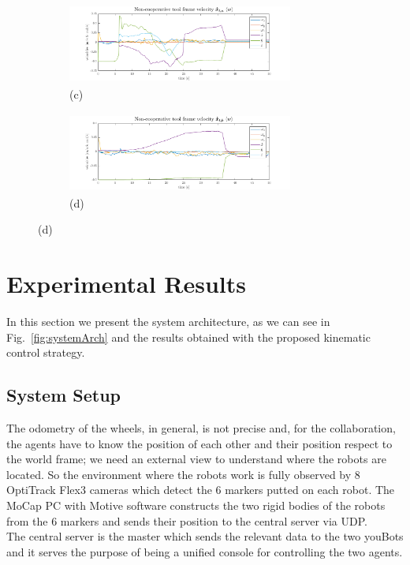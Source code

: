 \documentclass[a4paper, 12pt, notitlepage]{article}
\begin{document}
\begin{multicols}{2}
\begin{figure}[b!]
			\vspace{10px}
			\begin{subfigure}{.5\linewidth}
				\hspace{-30px}
				\includegraphics[width=280px,height=100px]{noncoopa}
				\caption{\hspace{-15px}(c)}
				\label{fig::c}
			\end{subfigure}
			\hfill
			\begin{subfigure}{.5\linewidth}
				\hspace{-10px}
				\includegraphics[width=280px,height=100px]{noncoopb}
				\caption{\hspace{25px}(d)}
				\label{fig::d}
			\end{subfigure}
			
		\end{figure}
			 
		\section{Experimental Results} \label{sec:res}
		In this section we present the system architecture, as we can see in Fig.\ \ref{fig:systemArch} and the results obtained with the proposed kinematic control strategy.
		
		\subsection{System Setup}
		\hspace{7px}The odometry of the wheels,  in general, is not precise and, for the collaboration, the agents have to know the position of each other and their position respect to the world frame; we need an external view to understand where the robots are located. So the environment where the robots work is fully observed by 8 OptiTrack Flex3 cameras which detect the 6 markers putted on each robot. The MoCap PC with Motive software constructs the two rigid bodies of the robots from the 6 markers and sends their position to the central server via UDP.\\The central server is the master which sends the relevant data to the two youBots and it serves the purpose of being a unified console for controlling the two agents. 
		

\end{multicols}
\end{document}

